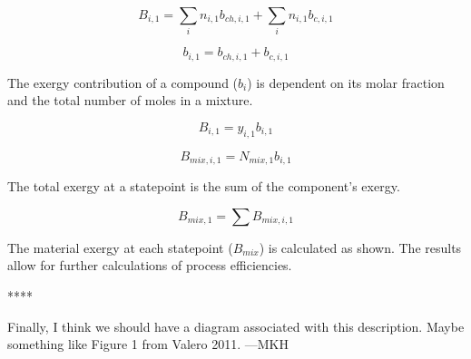 \documentclass[energies,article,submit,pdftex,moreauthors]{Definitions/mdpi}
\begin{document}
\begin{equation}\label{eq:specific_exergy_of_current_statepoint_definition}
  B_{i,1} = \sum_{i}{n_{i,1}b_{ch,i,1}} + \sum_{i}{n_{i,1}b_{c,i,1}}
\end{equation}

\begin{equation}\label{eq:simplified_material_exergy_of_current_statepoint_definition}
  b_{i,1} = b_{ch,i,1} + b_{c,i,1}
\end{equation}

The exergy contribution of a compound ($b_i$) is dependent
on its molar fraction
and the total number of moles
in a mixture.

\begin{equation}\label{eq:specific_exergy_of_current_statepoint_molar_based_definition}
  B_{i,1} = y_{i,1}b_{i,1}
\end{equation}

\begin{equation}\label{eq:specific_exergy_of_current_statepoint_mixture_definition}
  B_{mix,i,1} = N_{mix,1}b_{i,1}
\end{equation}

The total exergy at a statepoint
is the sum of the component's exergy.

\begin{equation}\label{eq:total_exergy_of_current_statepoint_mixture_definition}
  B_{mix,1} = \sum{B_{mix,i,1}}
\end{equation}

The material exergy at each statepoint ($B_{mix}$) is calculated as shown.
The results allow for further calculations
of process efficiencies.

%
%
%


****

Finally, I think we should have a diagram associated with this description.
Maybe something like Figure 1 from Valero 2011.
---MKH
\end{document}
